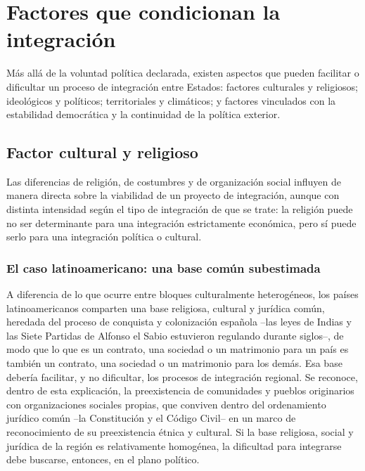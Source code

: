 \documentclass[12pt,oneside]{book}
\renewcommand{\chaptermark}[1]{\markboth{\thechapter.\ #1}{}}
\begin{document}
\chapter{Factores que condicionan la integración}
\chaptermark{Factores condicionantes}

Más allá de la voluntad política declarada, existen aspectos que pueden facilitar o dificultar un proceso de integración entre Estados: factores culturales y religiosos; ideológicos y políticos; territoriales y climáticos; y factores vinculados con la estabilidad democrática y la continuidad de la política exterior.

\section{Factor cultural y religioso}

Las diferencias de religión, de costumbres y de organización social influyen de manera directa sobre la viabilidad de un proyecto de integración, aunque con distinta intensidad según el tipo de integración de que se trate: la religión puede no ser determinante para una integración estrictamente económica, pero sí puede serlo para una integración política o cultural.

\subsection{El caso latinoamericano: una base común subestimada}

A diferencia de lo que ocurre entre bloques culturalmente heterogéneos, los países latinoamericanos comparten una base religiosa, cultural y jurídica común, heredada del proceso de conquista y colonización española --las leyes de Indias y las Siete Partidas de Alfonso el Sabio estuvieron regulando durante siglos--, de modo que lo que es un contrato, una sociedad o un matrimonio para un país es también un contrato, una sociedad o un matrimonio para los demás. Esa base debería facilitar, y no dificultar, los procesos de integración regional. Se reconoce, dentro de esta explicación, la preexistencia de comunidades y pueblos originarios con organizaciones sociales propias, que conviven dentro del ordenamiento jurídico común --la Constitución y el Código Civil-- en un marco de reconocimiento de su preexistencia étnica y cultural. Si la base religiosa, social y jurídica de la región es relativamente homogénea, la dificultad para integrarse debe buscarse, entonces, en el plano político.
\end{document}
